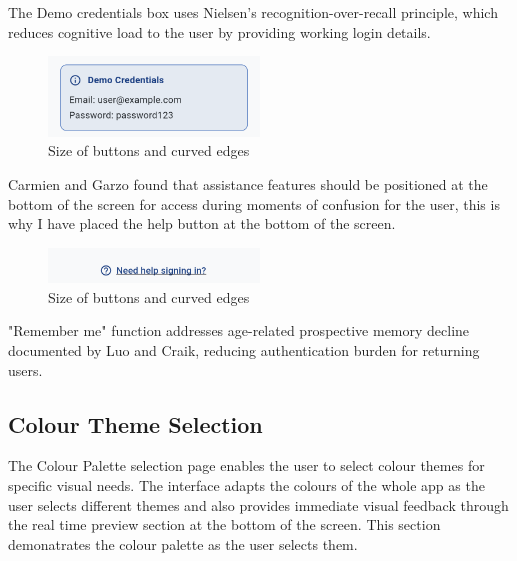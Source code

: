 \documentclass[]{project_final}
\begin{document}
The Demo credentials box uses Nielsen's recognition-over-recall principle, which reduces cognitive load to the user by providing working login details.

\begin{figure}[ht!]
  \centering
  \includegraphics[width=0.5\textwidth]{M Demo cred.png}
  \caption{Size of buttons and curved edges}
  \label{fig:1}
\end{figure}

Carmien and Garzo found that assistance features should be positioned at the bottom of the screen for access during moments of confusion for the user, this is why I have placed the help button at the bottom of the screen.

\begin{figure}[ht!]
  \centering
  \includegraphics[width=0.5\textwidth]{M Help Button.png}
  \caption{Size of buttons and curved edges}
  \label{fig:1}
\end{figure}

"Remember me" function addresses age-related prospective memory decline documented by Luo and Craik, reducing authentication burden for returning users.

\subsection{Colour Theme Selection}
The Colour Palette selection page enables the user to select colour themes for specific visual needs. The interface adapts the colours of the whole app as the user selects different themes and also provides immediate visual feedback through the real time preview section at the bottom of the screen. This section demonatrates the colour palette as the user selects them.
\end{document}
